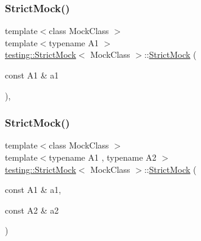 \mbox{\label{classtesting_1_1_strict_mock_a42db27ba0af29804db8589676817aff8}} 
\subsubsection{\texorpdfstring{Strict\+Mock()}{StrictMock()}\hspace{0.1cm}{\footnotesize\ttfamily [2/11]}}
{\footnotesize\ttfamily template$<$class Mock\+Class $>$ \\
template$<$typename A1 $>$ \\
\hyperlink{classtesting_1_1_strict_mock}{testing\+::\+Strict\+Mock}$<$ Mock\+Class $>$\+::\hyperlink{classtesting_1_1_strict_mock}{Strict\+Mock} (\begin{DoxyParamCaption}\item[{const A1 \&}]{a1 }\end{DoxyParamCaption})\hspace{0.3cm}{\ttfamily [inline]}, {\ttfamily [explicit]}}

\mbox{\label{classtesting_1_1_strict_mock_a345933f3f1a10de381a508f93e680c6b}} 
\subsubsection{\texorpdfstring{Strict\+Mock()}{StrictMock()}\hspace{0.1cm}{\footnotesize\ttfamily [3/11]}}
{\footnotesize\ttfamily template$<$class Mock\+Class $>$ \\
template$<$typename A1 , typename A2 $>$ \\
\hyperlink{classtesting_1_1_strict_mock}{testing\+::\+Strict\+Mock}$<$ Mock\+Class $>$\+::\hyperlink{classtesting_1_1_strict_mock}{Strict\+Mock} (\begin{DoxyParamCaption}\item[{const A1 \&}]{a1,  }\item[{const A2 \&}]{a2 }\end{DoxyParamCaption})\hspace{0.3cm}{\ttfamily [inline]}}

